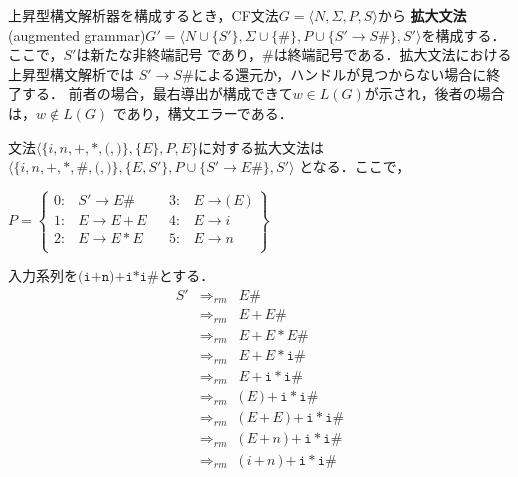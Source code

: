 \documentclass[a4j,dvipdfmx]{jbook}
\begin{document}
上昇型構文解析器を構成するとき，CF文法$G=\langle N,\Sigma,P,S\rangle$から
{\bf 拡大文法}(augmented grammar)$G'=\langle N\cup\{S'\},\Sigma\cup\{\texttt{\#}\},
P\cup\{S'\rightarrow S\#\},S'\rangle$を構成する．ここで，$S'$は新たな非終端記号
であり，$\texttt{\#}$は終端記号である．拡大文法における上昇型構文解析では
$S'\rightarrow S\texttt{\#}$による還元か，ハンドルが見つからない場合に終了する．
前者の場合，最右導出が構成できて$w\in L(G)$が示され，後者の場合は，$w\notin L(G)$
であり，構文エラーである．

\begin{Exmp}
  文法$\langle\{i,n,\texttt{+},\texttt{*},\texttt{(},\texttt{)}\},\{E\},P,E\}$に対する拡大文法は
  $\langle\{i,n,\texttt{+},\texttt{*},\texttt{\#},\texttt{(},\texttt{)}\},\{E,S'\},P\cup\{S'\rightarrow E\texttt{\#}\},S'\rangle$
  となる．ここで，
  
  $P=\left\{\begin{array}{rlcrl}
    0: & S'\rightarrow E\texttt{\#} & & 3: & E\rightarrow \texttt{(}\,E\,\texttt{)}\\
    1: & E\rightarrow E\,\texttt{+}\,E & & 4: & E\rightarrow i\\
    2: & E\rightarrow E\,\texttt{*}\,E & & 5: & E\rightarrow n\\
  \end{array}\right\}$

  入力系列を$\texttt{(i+n)+i*i\#}$とする．
  \[\begin{array}{rcl}
    S' & \Rightarrow_{rm} & E\texttt{\#}\\
       & \Rightarrow_{rm} & E\,\texttt{+}\,E\texttt{\#}\\
       & \Rightarrow_{rm} & E\,\texttt{+}\,E\,\texttt{*}\,E\texttt{\#}\\
       & \Rightarrow_{rm} & E\,\texttt{+}\,E\,\texttt{*}\,\texttt{i}\texttt{\#}\\
       & \Rightarrow_{rm} & E\,\texttt{+}\,\texttt{i}\,\texttt{*}\,\texttt{i}\texttt{\#}\\
       & \Rightarrow_{rm} & \texttt{(}\,E\,\texttt{)}\,\texttt{+}\,\texttt{i}\,\texttt{*}\,\texttt{i}\texttt{\#}\\
       & \Rightarrow_{rm} & \texttt{(}\,E\,\texttt{+}\,E\,\texttt{)}\,\texttt{+}\,\texttt{i}\,\texttt{*}\,\texttt{i}\texttt{\#}\\
       & \Rightarrow_{rm} & \texttt{(}\,E\,\texttt{+}\,n\,\texttt{)}\,\texttt{+}\,\texttt{i}\,\texttt{*}\,\texttt{i}\texttt{\#}\\
       & \Rightarrow_{rm} & \texttt{(}\,i\,\texttt{+}\,n\,\texttt{)}\,\texttt{+}\,\texttt{i}\,\texttt{*}\,\texttt{i}\texttt{\#}\\
      \end{array}\]


\end{Exmp}
\end{document}
